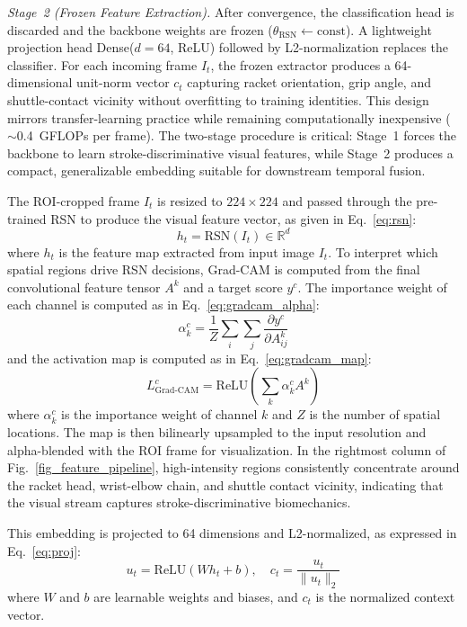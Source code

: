 \documentclass[pdflatex,sn-mathphys-num]{sn-jnl}
\theoremstyle{thmstyleone}%
\theoremstyle{thmstyletwo}%
\theoremstyle{thmstylethree}%
\begin{document}
\textit{Stage~2 (Frozen Feature Extraction).}
After convergence, the classification head is discarded and the backbone weights are frozen ($\theta_{\text{RSN}} \leftarrow \text{const}$). A lightweight projection head Dense($d{=}64$, ReLU) followed by L2-normalization replaces the classifier. For each incoming frame $I_t$, the frozen extractor produces a 64-dimensional unit-norm vector $c_t$ capturing racket orientation, grip angle, and shuttle-contact vicinity without overfitting to training identities. This design mirrors transfer-learning practice while remaining computationally inexpensive ($\sim$0.4~GFLOPs per frame). The two-stage procedure is critical: Stage~1 forces the backbone to learn stroke-discriminative visual features, while Stage~2 produces a compact, generalizable embedding suitable for downstream temporal fusion.

The ROI-cropped frame $I_t$ is resized to $224 \times 224$ and passed through the pre-trained RSN to produce the visual feature vector, as given in Eq.~\eqref{eq:rsn}:
\begin{equation}
h_{t} = \text{RSN}(I_{t}) \in \mathbb{R}^{d}
\label{eq:rsn}
\end{equation}
\noindent where $h_t$ is the feature map extracted from input image $I_t$. To interpret which spatial regions drive RSN decisions, Grad-CAM \cite{b31} is computed from the final convolutional feature tensor $A^{k}$ and a target score $y^{c}$. The importance weight of each channel is computed as in Eq.~\eqref{eq:gradcam_alpha}:
\begin{equation}
\alpha_k^{c} = \frac{1}{Z}\sum_i\sum_j \frac{\partial y^{c}}{\partial A_{ij}^{k}}
\label{eq:gradcam_alpha}
\end{equation}
and the activation map is computed as in Eq.~\eqref{eq:gradcam_map}:
\begin{equation}
L_{\text{Grad-CAM}}^{c} = \text{ReLU}\left(\sum_k \alpha_k^{c} A^{k}\right)
\label{eq:gradcam_map}
\end{equation}
\noindent where $\alpha_k^{c}$ is the importance weight of channel $k$ and $Z$ is the number of spatial locations. The map is then bilinearly upsampled to the input resolution and alpha-blended with the ROI frame for visualization. In the rightmost column of Fig.~\ref{fig_feature_pipeline}, high-intensity regions consistently concentrate around the racket head, wrist-elbow chain, and shuttle contact vicinity, indicating that the visual stream captures stroke-discriminative biomechanics.

This embedding is projected to 64 dimensions and L2-normalized, as expressed in Eq.~\eqref{eq:proj}:
\begin{equation}
u_{t} = \text{ReLU}(W h_{t} + b), \quad c_{t} = \frac{u_{t}}{\|u_{t}\|_2}
\label{eq:proj}
\end{equation}
\noindent where $W$ and $b$ are learnable weights and biases, and $c_t$ is the normalized context vector.
\end{document}
